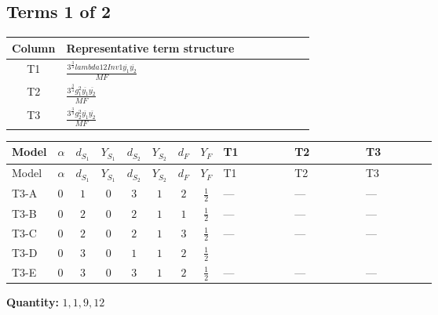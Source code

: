 \documentclass[8pt]{article}
\begin{document}
\begin{landscape}
\subsection*{Terms 1 of 2}
\begin{center}
\begin{tabular}{@{}c >{\raggedright\arraybackslash}p{0.82\linewidth}@{}}
\toprule
Column & Representative term structure \\
\midrule
T1 & \(\displaystyle \frac{3^{\frac{3}{4}} lambda12Inv1 \overline{y_{1}} \overline{y_{2}}}{MF}\) \\
\midrule
T2 & \(\displaystyle \frac{3^{\frac{3}{4}} g_{1}^{2} \overline{y_{1}} \overline{y_{2}}}{MF}\) \\
\midrule
T3 & \(\displaystyle \frac{3^{\frac{3}{4}} g_{2}^{2} \overline{y_{1}} \overline{y_{2}}}{MF}\) \\
\midrule
\bottomrule
\end{tabular}
\end{center}
\smallskip
\tiny
\begin{longtable}{@{}llcccccc >{\raggedright\arraybackslash}p{0.21\linewidth} >{\raggedright\arraybackslash}p{0.21\linewidth} >{\raggedright\arraybackslash}p{0.21\linewidth}@{}}
\toprule
Model & $\alpha$ & $d_{S_1}$ & $Y_{S_1}$ & $d_{S_2}$ & $Y_{S_2}$ & $d_F$ & $Y_F$ & T1 & T2 & T3 \\
\midrule
\endfirsthead
\toprule
Model & $\alpha$ & $d_{S_1}$ & $Y_{S_1}$ & $d_{S_2}$ & $Y_{S_2}$ & $d_F$ & $Y_F$ & T1 & T2 & T3 \\
\midrule
\endhead
T3-A & $0$ & $1$ & $0$ & $3$ & $1$ & $2$ & $\frac{1}{2}$ & --- & --- & --- \\
\midrule
T3-B & $0$ & $2$ & $0$ & $2$ & $1$ & $1$ & $\frac{1}{2}$ & --- & --- & --- \\
\midrule
T3-C & $0$ & $2$ & $0$ & $2$ & $1$ & $3$ & $\frac{1}{2}$ & --- & --- & --- \\
\midrule
T3-D & $0$ & $3$ & $0$ & $1$ & $1$ & $2$ & $\frac{1}{2}$ & \scriptsize\adjustbox{max width=\linewidth}{$\begin{gathered} \frac{3^{\frac{3}{4}} lambda12Inv1 \overline{y_{1}} \overline{y_{2}}}{6 MF}\end{gathered}$} & \scriptsize\adjustbox{max width=\linewidth}{$\begin{gathered} \frac{3^{\frac{3}{4}} g_{1}^{2} \overline{y_{1}} \overline{y_{2}}}{8 MF}\end{gathered}$} & \scriptsize\adjustbox{max width=\linewidth}{$\begin{gathered} \frac{11 \cdot 3^{\frac{3}{4}} g_{2}^{2} \overline{y_{1}} \overline{y_{2}}}{8 MF}\end{gathered}$} \\
\midrule
T3-E & $0$ & $3$ & $0$ & $3$ & $1$ & $2$ & $\frac{1}{2}$ & --- & --- & --- \\
\midrule
\bottomrule
\end{longtable}
\clearpage
\noindent\textbf{Quantity: }$\mathrm{1,1,9,12}$\par\smallskip

\end{landscape}
\end{document}

